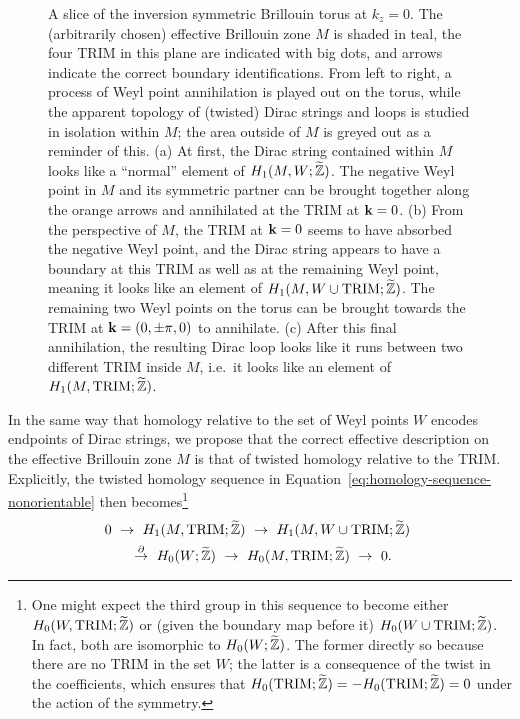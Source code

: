 \begin{figure}[htb!]
	\caption{A slice of the inversion symmetric Brillouin torus at $k_z=0$. The (arbitrarily chosen) effective Brillouin zone $M$ is shaded in teal, the four TRIM in this plane are indicated with big dots, and arrows indicate the correct boundary identifications. From left to right, a process of Weyl point annihilation is played out on the torus, while the apparent topology of (twisted) Dirac strings and loops is studied in isolation within $M$; the area outside of $M$ is greyed out as a reminder of this. (a) At first, the Dirac string contained within $M$ looks like a ``normal'' element of $H_1(M,W;\widetilde{\mathbb{Z}})$. The negative Weyl point in $M$ and its symmetric partner can be brought together along the orange arrows and annihilated at the TRIM at $\vb{k}=0$. (b) From the perspective of $M$, the TRIM at $\vb{k}=0$ seems to have absorbed the negative Weyl point, and the Dirac string appears to have a boundary at this TRIM as well as at the remaining Weyl point, meaning it looks like an element of $H_1(M,W\cup\text{TRIM};\widetilde{\mathbb{Z}})$. The remaining two Weyl points on the torus can be brought towards the TRIM at $\vb{k}=(0,\pm\pi,0)$ to annihilate. (c) After this final annihilation, the resulting Dirac loop looks like it runs between two different TRIM inside $M$, i.e.\ it looks like an element of $H_1(M,\text{TRIM};\widetilde{\mathbb{Z}})$.}
	\label{fig:inversion_Dirac-strings}
\end{figure}
In the same way that homology relative to the set of Weyl points $W$ encodes endpoints of Dirac strings, we propose that the correct effective description on the effective Brillouin zone $M$ is that of twisted homology relative to the TRIM. Explicitly, the twisted homology sequence in Equation~\eqref{eq:homology-sequence-nonorientable} then becomes\footnote{
	One might expect the third group in this sequence to become either $H_0(W,\text{TRIM};\widetilde{\mathbb{Z}})$ or (given the boundary map before it) $H_0(W\cup\text{TRIM};\widetilde{\mathbb{Z}})$. In fact, both are isomorphic to $H_0(W;\widetilde{\mathbb{Z}})$. The former directly so because there are no TRIM in the set $W$; the latter is a consequence of the twist in the coefficients, which ensures that $H_0(\text{TRIM};\widetilde{\mathbb{Z}}) = -H_0(\text{TRIM};\widetilde{\mathbb{Z}}) = 0$ under the action of the symmetry.}
\begin{align*}
	0\ &\to\ H_1(M, \text{TRIM}; \widetilde{\mathbb{Z}})\ \to\ H_1(M, W\cup\text{TRIM}; \widetilde{\mathbb{Z}})\ \\
	&\quad \overset{\partial}{\to}\ H_0(W;\widetilde{\mathbb{Z}})\ \to\ H_0(M, \text{TRIM}; \widetilde{\mathbb{Z}})\ \to\ 0.
\end{align*}

